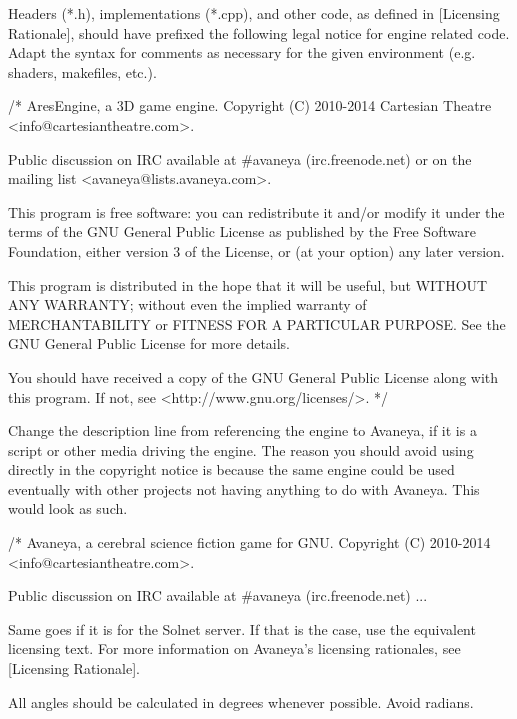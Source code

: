 Headers (*.h), implementations (*.cpp), and other code, as defined in [Licensing Rationale], should have prefixed the following legal notice for engine related code. Adapt the syntax for comments as necessary for the given environment (e.g. shaders, makefiles, etc.).

\startCodeExample
/*
    AresEngine, a 3D game engine.
    Copyright (C) 2010-2014 Cartesian Theatre <info@cartesiantheatre.com>.

    Public discussion on IRC available at #avaneya (irc.freenode.net)
    or on the mailing list <avaneya@lists.avaneya.com>.

    This program is free software: you can redistribute it and/or modify
    it under the terms of the GNU General Public License as published by
    the Free Software Foundation, either version 3 of the License, or
    (at your option) any later version.

    This program is distributed in the hope that it will be useful,
    but WITHOUT ANY WARRANTY; without even the implied warranty of
    MERCHANTABILITY or FITNESS FOR A PARTICULAR PURPOSE.  See the
    GNU General Public License for more details.

    You should have received a copy of the GNU General Public License
    along with this program.  If not, see <http://www.gnu.org/licenses/>.
*/
\stopCodeExample

Change the description line from referencing the engine to Avaneya, if it is a script or other media driving the engine. The reason you should avoid using  directly in the copyright notice is because the same engine could be used eventually with other projects not having anything to do with Avaneya. This would look as such.

\startCodeExample
/*
    Avaneya, a cerebral science fiction game for GNU.
    Copyright (C) 2010-2014 <info@cartesiantheatre.com>.

    Public discussion on IRC available at #avaneya (irc.freenode.net)
    ...
\stopCodeExample

Same goes if it is for the Solnet server. If that is the case, use the equivalent licensing text. For more information on Avaneya's licensing rationales, see [Licensing Rationale].


\startitemize[4]
\item
All angles should be calculated in degrees whenever possible. Avoid radians.

